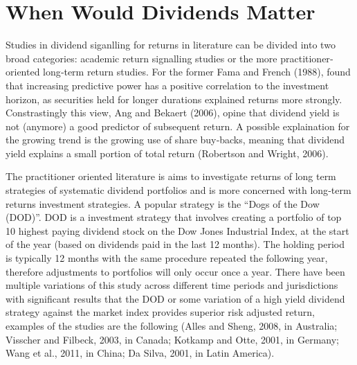 \documentclass[
]{article}
\begin{document}
\hypertarget{when-would-dividends-matter}{%
\section{When Would Dividends
Matter}\label{when-would-dividends-matter}}

Studies in dividend siganlling for returns in literature can be divided
into two broad categories: academic return signalling studies or the
more practitioner‐oriented long‐term return studies. For the former Fama
and French (1988), found that increasing predictive power has a positive
correlation to the investment horizon, as securities held for longer
durations explained returns more strongly. Constrastingly this view, Ang
and Bekaert (2006), opine that dividend yield is not (anymore) a good
predictor of subsequent return. A possible explaination for the growing
trend is the growing use of share buy‐backs, meaning that dividend yield
explains a small portion of total return (Robertson and Wright, 2006).

The practitioner oriented literature is aims to investigate returns of
long term strategies of systematic dividend portfolios and is more
concerned with long‐term returns investment strategies. A popular
strategy is the ``Dogs of the Dow (DOD)''. DOD is a investment strategy
that involves creating a portfolio of top 10 highest paying dividend
stock on the Dow Jones Industrial Index, at the start of the year (based
on dividends paid in the last 12 months). The holding period is
typically 12 months with the same procedure repeated the following year,
therefore adjustments to portfolios will only occur once a year. There
have been multiple variations of this study across different time
periods and jurisdictions with significant results that the DOD or some
variation of a high yield dividend strategy against the market index
provides superior risk adjusted return, examples of the studies are the
following (Alles and Sheng, 2008, in Australia; Visscher and Filbeck,
2003, in Canada; Kotkamp and Otte, 2001, in Germany; Wang et al., 2011,
in China; Da Silva, 2001, in Latin America).
\end{document}
